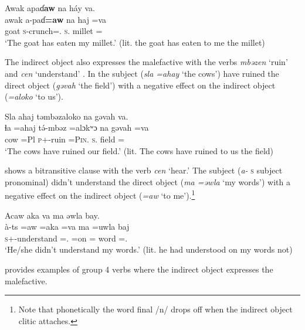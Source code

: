 \ea \label{ex:9:20}
Awak  apaɗ\textbf{aw}   na  háy  va.\\
\gll  awak a-paɗ\textbf{=aw}    na   haj  =va\\
      goat    \textsc{s}-crunch={\oneS}.{\IO}   \textsc{s}.{\DO}   millet  ={\PRF}\\
\glt  ‘The goat has eaten my millet.’ (lit. the goat has eaten to me the millet) 
\z

The indirect object also expresses the malefactive with the verbs \textit{mbəzen} ‘ruin’  and \textit{cen} ‘understand’ . In  the subject (\textit{sla =ahay }‘the cows’) have ruined the direct object (\textit{gəvah} ‘the field’) with a negative effect on the indirect object (\textit{=aloko} ‘to us’).

\ea \label{ex:9:21}
Sla  ahaj  təmbəzaloko  na  gəvah  va.\\
\gll  ɬa       =ahaj   t\'{ə}-mbəz    =alɔkʷɔ        na     gəvah  =va\\
      cow    =Pl       \textsc{p}+{\PFV}-ruin  =\textsc{Pin}.{\IO}  \textsc{s}.{\DO}  \textit{   }field   ={\PRF}\\
\glt  ‘The cows have ruined our field.’ (lit. The cows have ruined to us the field)
\z

 shows a bitransitive clause with the verb \textit{cen} ‘hear.’ The subject (\textit{a-} \textsc{s} subject pronominal) didn’t understand the direct object (\textit{ma =əwla} ‘my words’) with a negative effect on the indirect object (\textit{=aw} ‘to me’).\footnote{Note that phonetically the word final /n/ drops off when the indirect object clitic attaches.} 

\ea \label{ex:9:22}
Acaw  aka  va  ma  əwla  bay.\\
\gll  à-ts    =aw     =aka  =va     ma      =uwla      baj\\
      \textsc{s}+{\PFV}-understand  ={\oneS}.{\IO}  =on        ={\PRF}  word   ={\oneS}.{\POSS}  {\NEG}\\
\glt  ‘He/she didn’t understand my words.’ (lit. he had understood on my words not)
\z

 provides examples of group 4 verbs where the indirect object expresses the malefactive.

